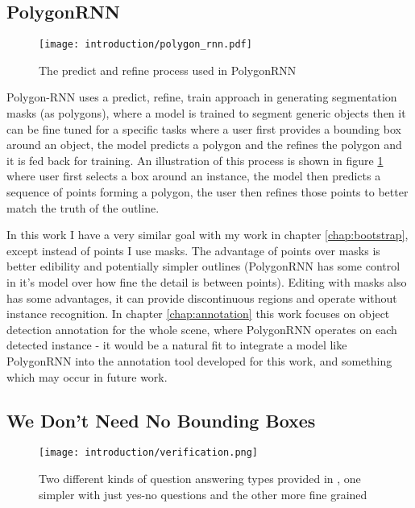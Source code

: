 \subsection {PolygonRNN \cite{Castrejon2017}}

\begin{figure}[h]
  \centering
  \texttt{[image: introduction/polygon\_rnn.pdf]}
  \caption{The predict and refine process used in PolygonRNN \cite{Castrejon2017}}  
  \label{fig:polygon_rnn}
\end{figure}


Polygon-RNN \cite{Castrejon2017} uses a predict, refine, train approach in generating segmentation masks (as polygons), where a model is trained to segment generic objects then it can be fine tuned for a specific tasks where a user first provides a bounding box around an object, the model predicts a polygon and the refines the polygon and it is fed back for training. An illustration of this process is shown in figure \ref{fig:polygon_rnn} where user first selects a box around an instance, the model then predicts a sequence of points forming a polygon, the user then refines those points to better match the truth of the outline.

In this work I have a very similar goal with my work in chapter \ref{chap:bootstrap}, except instead of points I use masks. The advantage of points over masks is better edibility and potentially simpler outlines (PolygonRNN has some control in it's model over how fine the detail is between points). Editing with masks also has some advantages, it can provide discontinuous regions and operate without instance recognition. In chapter \ref{chap:annotation} this work focuses on object detection annotation for the whole scene, where PolygonRNN operates on each detected instance - it would be a natural fit to integrate a model like PolygonRNN into the annotation tool developed for this work, and something which may occur in future work.


\subsection {We Don't Need No Bounding Boxes}

\begin{figure}[h]
  \centering
  \texttt{[image: introduction/verification.png]}
  \caption{Two different kinds of question answering types provided in \cite{Papadopoulos2016}, one simpler with just yes-no questions and the other more fine grained}
  \label{fig:verification}
\end{figure}

